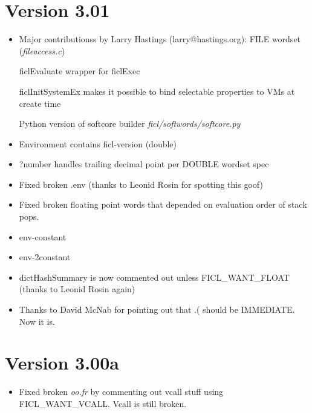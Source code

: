 \section*{Version 3.01}
\begin{itemize}[noitemsep]
	\item Major contributionss by Larry Hastings (larry@hastings.org):
		\subitem FILE wordset (\textit{fileaccess.c})

		\subitem ficlEvaluate wrapper for ficlExec

		\subitem ficlInitSystemEx makes it possible to bind
		selectable properties to VMs at create time

		\subitem Python version of softcore builder
		\textit{ficl/softwords/softcore.py}
	\item Environment contains ficl-version (double)

	\item ?number handles trailing decimal point per DOUBLE wordset
	spec

	\item Fixed broken .env (thanks to Leonid Rosin for spotting
	this goof)

	\item Fixed broken floating point words that depended on
	evaluation order of stack pops.

	\item env-constant

	\item env-2constant

	\item dictHashSummary is now commented out unless
	FICL\_WANT\_FLOAT (thanks to Leonid Rosin again)

	\item Thanks to David McNab for pointing out that .( should be
	IMMEDIATE. Now it is.
\end{itemize}


\section*{Version 3.00a}
\begin{itemize}[noitemsep]
	\item Fixed broken \textit{oo.fr} by commenting out vcall stuff
	using FICL\_WANT\_VCALL. Vcall is still broken.
\end{itemize}


